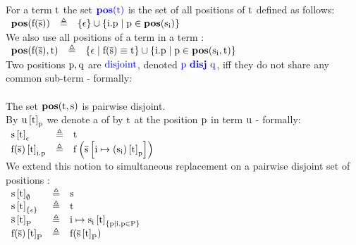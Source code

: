 \noindent
For a term $\m{t}$ the set $\newdef{\m{\poss{t}}}$ is the set of all positions of $\m{t}$ defined as follows:\\
$
\begin{array}{lll}
	\poss{\fa{f}{s}} & \triangleq & \s{\emptySeq} \cup \s{i.p \mid p \in \poss{s_i}} \\
\end{array}
$\\
We also use all positions of a term  in a term :\\
$
\begin{array}{lll}
	\posss{\fa{f}{s}}{t} & \triangleq & \s{\emptySeq \mid \fa{f}{s}\equiv t} \cup \s{i.p \mid p \in \posss{s_i}{t}} \\
\end{array}
$\\
Two positions $\m{p,q}$ are $\newdef{\mbox{disjoint}}$, denoted $\newdef{\disj{p}{q}}$, iff they do not share any common sub-term - formally:\\
\\
The set $\posss{t}{s}$ is pairwise disjoint.\\
By $\termRepAt{u}{t}{p}$ we denote a  of  by $\term{t}$ at the position $\term{p}$ in term $\term{u}$ - formally:\\
$
\begin{array}{lll}
	\termRepAt{s        }{t}{\emptySeq} & \triangleq & \term{t} \\
	\termRepAt{\fa{f}{s}}{t}{i.p      } & \triangleq & \term{f}\left(\tupRepAt{s}{i}{\termRepAt{(\tupAt{s}{i})}{t}{p}}\right) \\
\end{array}
$\\
We extend this notion to simultaneous replacement on a pairwise disjoint set of positions :\\
$
\begin{array}{lll}
	\termRepAt{s        }{t}{\emptyset}     & \triangleq & \term{s} \\
	\termRepAt{s        }{t}{\s{\emptySeq}} & \triangleq & \term{t} \\
	\termRepAt{\tup{s}  }{t}{P            } & \triangleq & \m{i \mapsto \termRepAt{s_i}{t}{\s{p \mid i.p \in P}}} \\
	\termRepAt{\fa{f}{s}}{t}{P            } & \triangleq & \m{f(\termRepAt{\tup{s}  }{t}{P            })} \\
\end{array}
$

